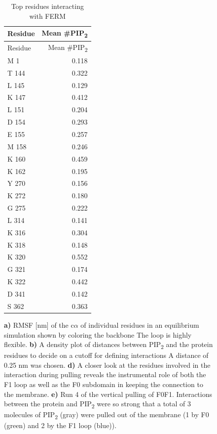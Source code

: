 \documentclass[
  letterpaper,
  DIV=11,
  numbers=noendperiod]{scrartcl}
\begin{document}
\begin{figure}
\begin{minipage}[t]{0.33\linewidth}
{}

\end{minipage}%
%
\begin{minipage}[t]{0.33\linewidth}

{\centering 

\begin{longtable}[]{@{}lr@{}}
\caption{\label{tbl-ferm-top-interacting}Top residues interacting with
FERM}\tabularnewline
\toprule()
Residue & Mean \#PIP\textsubscript{2} \\
\midrule()
\endfirsthead
\toprule()
Residue & Mean \#PIP\textsubscript{2} \\
\midrule()
\endhead
M 1 & 0.118 \\
T 144 & 0.322 \\
L 145 & 0.129 \\
K 147 & 0.412 \\
L 151 & 0.204 \\
D 154 & 0.293 \\
E 155 & 0.257 \\
M 158 & 0.246 \\
K 160 & 0.459 \\
K 162 & 0.195 \\
Y 270 & 0.156 \\
K 272 & 0.180 \\
G 275 & 0.222 \\
L 314 & 0.141 \\
K 316 & 0.304 \\
K 318 & 0.148 \\
K 320 & 0.552 \\
G 321 & 0.174 \\
K 322 & 0.442 \\
D 341 & 0.142 \\
S 362 & 0.363 \\
\bottomrule()
\end{longtable}

}

\end{minipage}%

\caption{\label{fig-suppl}\textbf{a)} RMSF {[}nm{]} of the c\(\alpha\)
of individual residues in an equilibrium simulation shown by coloring
the backbone The loop is highly flexible. \textbf{b)} A density plot of
distances between PIP\textsubscript{2} and the protein residues to
decide on a cutoff for defining interactions A distance of 0.25 nm was
chosen. \textbf{d)} A closer look at the residues involved in the
interaction during pulling reveals the instrumental role of both the F1
loop as well as the F0 subdomain in keeping the connection to the
membrane. \textbf{e)} Run 4 of the vertical pulling of F0F1.
Interactions between the protein and PIP\textsubscript{2} were so strong
that a total of 3 molecules of PIP\textsubscript{2} (gray) were pulled
out of the membrane (1 by F0 (green) and 2 by the F1 loop (blue)).}

\end{figure}
\end{document}
